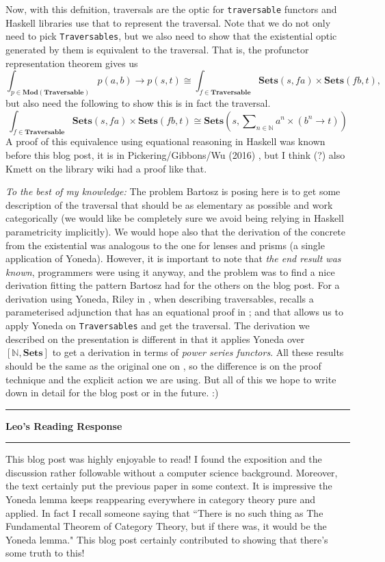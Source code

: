\documentclass{amsart}
\newcommand{\iam}[1]{
  \vspace{0.25em}
  \hrule
  \vspace{0.25em}
  \textbf{{#1}'s Reading Response}
  \vspace{0.25em}
  \hrule
  \vspace{1em}
}
\begin{document}
Now, with this defnition, traversals are the optic for
\texttt{traversable} functors and Haskell libraries use that to
represent the traversal.  Note that we do not only need to pick
\texttt{Traversables}, but we also need to show that the existential
optic generated by them is equivalent to the traversal.  That is, the
profunctor representation theorem gives us
\[
  \int_{p \in \mathbf{Mod}(\mathbf{Traversable})} p(a,b) \to p(s,t)
  \cong
  \int_{f \in \mathbf{Traversable}} \mathbf{Sets}(s,fa) \times \mathbf{Sets}(fb,t),
\]
but also need the following to show this is in fact the traversal.
\[
  \int_{f \in \mathbf{Traversable}} \mathbf{Sets}(s,fa) \times \mathbf{Sets}(fb,t)
  \cong
  \mathbf{Sets}\left(s , \sum\nolimits_{n \in \mathbb{N}} a^n \times (b^n \to t)\right)
\]
A proof of this equivalence using equational reasoning in Haskell was
known before this blog post, it is in Pickering/Gibbons/Wu (2016) \cite{pickeringOptics},
but I think (?) also Kmett on the library wiki had a proof like that.

\textit{To the best of my knowledge:} The problem Bartosz is posing here is to get some description of the
traversal that should be as elementary as possible and work
categorically (we would like be completely sure we avoid being relying
in Haskell parametricity implicitly).  We would hope also that the
derivation of the concrete from the existential was analogous to the
one for lenses and prisms (a single application of Yoneda). However, it
is important to note that
\textit{the end result was known}, programmers were using it anyway, and
the problem was to find a nice derivation fitting the pattern Bartosz had
for the others on the blog post.  For a derivation
using Yoneda, Riley in \cite{categoriesOfOptics}, when describing
traversables, recalls a parameterised adjunction that has an
equational proof in \cite{jaskelioffoconnor}; and that allows us to
apply Yoneda on \texttt{Traversables} and get the traversal.  The
derivation we described on the presentation is different in that it
applies Yoneda over $[ \mathbb{N} , \mathbf{Sets} ]$ to get a
derivation in terms of \textit{power series functors}. All these
results should be the same as the original one on
\cite{pickeringOptics}, so the difference is on the proof technique
and the explicit action we are using. But all of this we hope to write
down in detail for the blog post or in the future.  :)

  
\iam{Leo}

This blog post was highly enjoyable to read! I found the exposition and the discussion rather followable without a computer science background. Moreover, the text certainly put the previous paper in some context. It is impressive the Yoneda lemma keeps reappearing everywhere in category theory pure and applied. In fact I recall someone saying that ``There is no such thing as The Fundamental Theorem of Category Theory, but if there was, it would be the Yoneda lemma." This blog post certainly contributed to showing that there's some truth to this!
\end{document}
